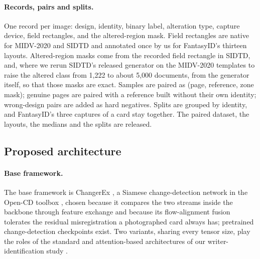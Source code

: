 \documentclass[11pt,a4paper]{article}
\begin{document}
\paragraph{Records, pairs and splits.} One record per image: design, identity, binary label, alteration type, capture device, field rectangles, and the altered-region mask. Field rectangles are native for MIDV-2020 and SIDTD and annotated once by us for FantasyID's thirteen layouts. Altered-region masks come from the recorded field rectangle in SIDTD, and, where we rerun SIDTD's released generator on the MIDV-2020 templates to raise the altered class from 1,222 to about 5,000 documents, from the generator itself, so that those masks are exact. Samples are paired as (page, reference, zone mask); genuine pages are paired with a reference built without their own identity; wrong-design pairs are added as hard negatives. Splits are grouped by identity, and FantasyID's three captures of a card stay together. The paired dataset, the layouts, the medians and the splits are released.

\FloatBarrier
\subsection{Proposed architecture}
\label{sec:arch}

\paragraph{Base framework.} The base framework is ChangerEx \cite{fang2023changer}, a Siamese change-detection network in the Open-CD toolbox \cite{li2025opencd}, chosen because it compares the two streams inside the backbone through feature exchange and because its flow-alignment fusion tolerates the residual misregistration a photographed card always has; pretrained change-detection checkpoints exist. Two variants, sharing every tensor size, play the roles of the standard and attention-based architectures of our writer-identification study \cite{abushahla2026ijdar}.
\end{document}
